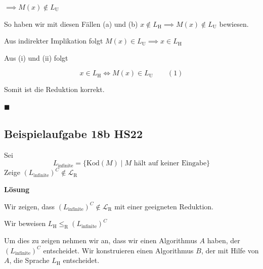 \documentclass[a4paper, 11pt]{article}
\def\Lr{\mathcal{L}_\text{R}}
\begin{document}
\begin{enumerate}[label=(\roman*)]
\begin{enumerate}[label=(\alph*)]
                                    $\implies M(x) \notin L_{\text{U}}$
                
                                   
                                    
                                    
                                \end{enumerate}
                                
                                 So haben wir mit diesen Fällen (a) und (b) $x \notin L_{\text{H}} \implies M(x) \notin L_{\text{U}}$ bewiesen. 
                                 
                                 Aus indirekter Implikation folgt $M(x) \in L_{\text{U}} \implies x \in L_{\text{H}}$
                                     
                        \end{enumerate}
                
                   
                
                    Aus (i) und (ii) folgt 
                    
                    $$x \in L_{\text{H}} \iff M(x) \in L_{\text{U}} \qquad (1)$$
                
                    Somit ist die Reduktion korrekt.
                
                    \hspace*{0pt}\hfill$\blacksquare$
                
                
                
                    \subsection{Beispielaufgabe 18b HS22}
    
                    Sei $$L_{\text{infinite}} = \{\text{Kod}(M) \mid \text{$M$ hält auf keiner Eingabe}\}$$
                    Zeige $(L_{\text{infinite}})^C \notin \Lr$
                
                
                    \textbf{Lösung}
    
                    Wir zeigen, dass $(L_{\text{infinite}})^C \notin \Lr$ mit einer geeigneten Reduktion.
                
                    Wir beweisen $L_{\text{H}} \leq_{\text{R}} (L_{\text{infinite}})^C$
                
                    Um dies zu zeigen nehmen wir an, dass wir einen Algorithmus $A$ haben, der $(L_{\text{infinite}})^C$ entscheidet.
                     Wir konstruieren einen Algorithmus $B$, der mit Hilfe von $A$, die Sprache $L_{\text{H}}$ entscheidet. 
                     
\end{document}
